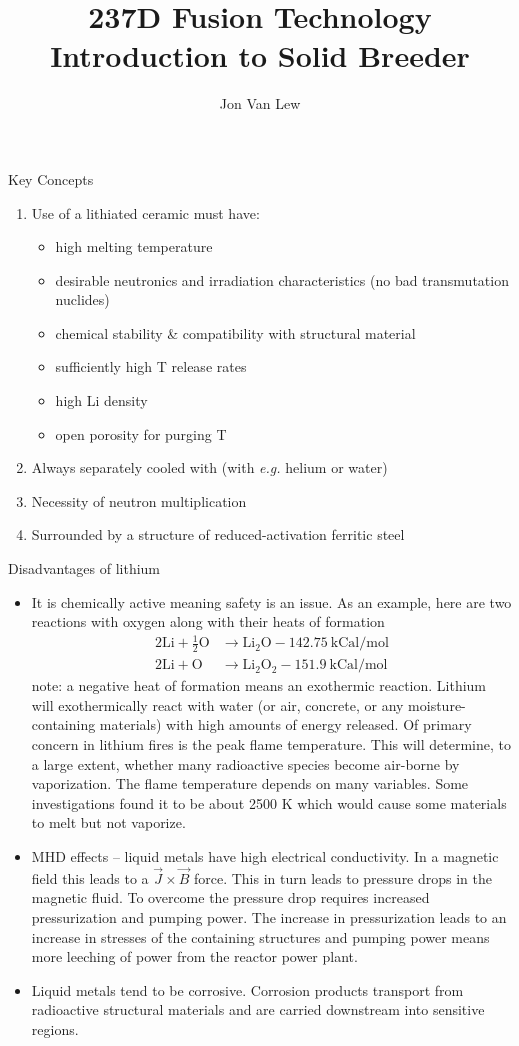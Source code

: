 \documentclass[11pt]{report} %
\title{237D Fusion Technology \\
Introduction to Solid Breeder}
\author{Jon Van Lew}
\begin{document}
\maketitle
Key Concepts
\begin{enumerate}
\item{Use of a lithiated ceramic must have:}
\begin{itemize}
\item{high melting temperature}
\item{desirable neutronics and irradiation characteristics (no bad transmutation nuclides)}
\item{chemical stability \& compatibility with structural material}
\item{sufficiently high T release rates}
\item{high Li density}
\item{open porosity for purging T}
\end{itemize}
\item{Always separately cooled with (with \textit{e.g.} helium or water)}
\item{Necessity of neutron multiplication}
\item{Surrounded by a structure of reduced-activation ferritic steel}
\end{enumerate}


Disadvantages of lithium
\begin{itemize}
\item {It is chemically active meaning safety is an issue. As an example, here are two reactions with oxygen along with their heats of formation
\begin{align*}
2\mathrm{Li} + \frac{1}{2}\mathrm{O} &\rightarrow \mathrm{Li}_2\mathrm{O} - 142.75~\text{kCal/mol}\\
2\mathrm{Li} + \mathrm{O} &\rightarrow \mathrm{Li}_2\mathrm{O}_2 - 151.9~\text{kCal/mol}
\end{align*}
note: a negative heat of formation means an exothermic reaction. Lithium will exothermically react with water (or air, concrete, or any moisture-containing materials) with high amounts of energy released. Of primary concern in lithium fires is the peak flame temperature. This will determine, to a large extent, whether many radioactive species become air-borne by vaporization. The flame temperature depends on many variables. Some investigations found it to be  about 2500 K which would cause some materials to melt but not vaporize.}
\item MHD effects -- liquid metals have high electrical conductivity. In a magnetic field this leads to a $\vec{J}\times\vec{B}$ force. This in turn leads to pressure drops in the magnetic fluid. To overcome the pressure drop requires increased pressurization and pumping power. The increase in pressurization leads to an increase in stresses of the containing structures and pumping power means more leeching of power from the reactor power plant.
\item Liquid metals tend to be corrosive. Corrosion products transport from radioactive structural materials and are carried downstream into sensitive regions.
\end{itemize}
\end{document}
